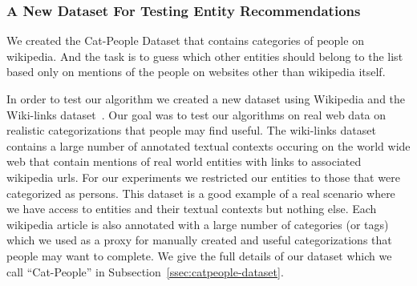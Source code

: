 \documentclass{article}
\newcommand{\ssecref}[1]{Subsection~\ref{#1}}
\begin{document}
\subsubsection{A New Dataset For Testing Entity Recommendations}
\label{sssec:cp}
We created the Cat-People Dataset that contains categories of people on wikipedia.
And the task is to guess which other entities should belong to the list
based only on mentions of the people on websites other than wikipedia itself.

In order to test our algorithm we created a new dataset using Wikipedia and the
Wiki-links dataset~\cite{singh2012wikilinks}. Our goal was to test our
algorithms on real web data on realistic categorizations that people may find
useful. The wiki-links dataset contains a large number of annotated textual contexts
occuring on the world wide web that contain mentions of real world entities with
links to associated wikipedia urls. For our experiments we restricted our
entities to those that were categorized as persons. This dataset is a good example of a real
scenario where we have access to entities and their textual contexts but nothing
else. Each wikipedia article is also annotated with a large number of categories (or
tags) which we used as a proxy for manually created and useful categorizations
that people may want to complete. We give the full details of our dataset which
we call ``Cat-People'' in \ssecref{ssec:catpeople-dataset}.

\begin{table}[htbp]
  \centering
  \caption{Examples of rejected and accepted categories. Rejected categories are on left and Accepted are on right.}
  \label{tab:example-categories}
\end{table}
\end{document}
